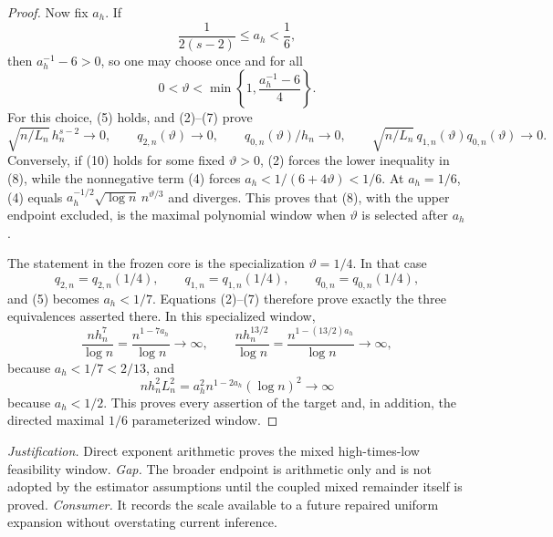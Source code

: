 \documentclass{article}
\begin{document}
\begin{proof}
Now fix \(a_h\).  If
\[
 \frac1{2(s-2)}\leq a_h<\frac16,
\tag{8}
\]
then \(a_h^{-1}-6>0\), so one may choose once and for all
\[
 0<\vartheta<\min\left\{1,\frac{a_h^{-1}-6}{4}\right\}.
\tag{9}
\]
For this choice, (5) holds, and (2)--(7) prove
\[
 \sqrt{n/L_n}\,h_n^{s-2}\to0,
 \qquad q_{2,n}(\vartheta)\to0,
 \qquad q_{0,n}(\vartheta)/h_n\to0,
 \qquad
 \sqrt{n/L_n}\,q_{1,n}(\vartheta)q_{0,n}(\vartheta)\to0.
\tag{10}
\]
Conversely, if (10) holds for some fixed \(\vartheta>0\), (2) forces the lower inequality in (8), while the nonnegative term (4) forces
\(a_h<1/(6+4\vartheta)<1/6\).  At \(a_h=1/6\), (4) equals
\(a_h^{-1/2}\sqrt{\log n}\,n^{\vartheta/3}\) and diverges.  This proves that (8), with the upper endpoint excluded, is the maximal polynomial window when \(\vartheta\) is selected after \(a_h\).

The statement in the frozen core is the specialization \(\vartheta=1/4\).  In that case
\[
 q_{2,n}=q_{2,n}(1/4),\qquad
 q_{1,n}=q_{1,n}(1/4),\qquad
 q_{0,n}=q_{0,n}(1/4),
\]
and (5) becomes \(a_h<1/7\).  Equations (2)--(7) therefore prove exactly the three equivalences asserted there.  In this specialized window,
\[
 \frac{n h_n^7}{\log n}
 =\frac{n^{1-7a_h}}{\log n}\to\infty,
 \qquad
 \frac{n h_n^{13/2}}{\log n}
 =\frac{n^{1-(13/2)a_h}}{\log n}\to\infty,
\tag{11}
\]
because \(a_h<1/7<2/13\), and
\[
 n h_n^2L_n^2
 =a_h^2n^{1-2a_h}(\log n)^2\to\infty
\tag{12}
\]
because \(a_h<1/2\).  This proves every assertion of the target and, in addition, the directed maximal \(1/6\) parameterized window.
\end{proof}
\par\smallskip\noindent \textit{Justification.} Direct exponent arithmetic proves the mixed high-times-low feasibility window. \textit{Gap.} The broader endpoint is arithmetic only and is not adopted by the estimator assumptions until the coupled mixed remainder itself is proved. \textit{Consumer.} It records the scale available to a future repaired uniform expansion without overstating current inference.
\end{document}
